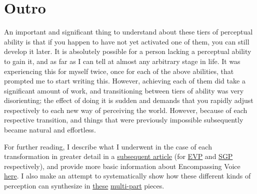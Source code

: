 \documentclass[]{article}
\begin{document}
\section{Outro}

An important and significant thing to understand about these tiers of perceptual ability is that if you happen to have not yet activated one of them, you can still develop it later. It is absolutely possible for a person lacking a perceptual ability to gain it, and as far as I can tell at almost any arbitrary stage in life. It was experiencing this for myself twice, once for each of the above abilities, that prompted me to start writing this. However, achieving each of them did take a significant amount of work, and transitioning between tiers of ability was very disorienting; the effect of doing it is sudden and demands that you rapidly adjust respectively to each new way of perceiving the world. However, because of each respective transition, and things that were previously impossible subsequently became natural and effortless.

For further reading, I describe what I underwent in the case of each transformation in greater detail in a \href{http://chromaticproduction.blogspot.com/2016/10/five-years-ago-unexpected-thing.html}{subsequent article} (for \href{http://chromaticproduction.blogspot.com/2016/10/five-years-ago-unexpected-thing.htmlhttp://chromaticproduction.blogspot.com/2016/10/five-years-ago-unexpected-thing.html}{EVP} and \href{http://chromaticproduction.blogspot.com/2016/10/five-years-ago-unexpected-thing.html#SGPstory}{SGP} respectively), and provide more basic information about Encompassing Voice \href{http://chromaticproduction.blogspot.com.au/2016/11/encompassing-voice-perception-faq.html}{here}. I also make an attempt to systematically show how these different kinds of perception can synthesize in \href{http://chromaticproduction.blogspot.com.au/2017/05/variant-construction-part-1-definitions.html}{these} \href{http://chromaticproduction.blogspot.com.au/2017/09/defining-poetry-establishing-structure.html}{multi-part} pieces.
\end{document}
